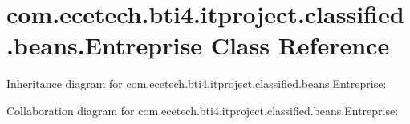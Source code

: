\hypertarget{classcom_1_1ecetech_1_1bti4_1_1itproject_1_1classified_1_1beans_1_1_entreprise}{}\section{com.\+ecetech.\+bti4.\+itproject.\+classified.\+beans.\+Entreprise Class Reference}
\label{classcom_1_1ecetech_1_1bti4_1_1itproject_1_1classified_1_1beans_1_1_entreprise}


Inheritance diagram for com.\+ecetech.\+bti4.\+itproject.\+classified.\+beans.\+Entreprise\+:


Collaboration diagram for com.\+ecetech.\+bti4.\+itproject.\+classified.\+beans.\+Entreprise\+:
